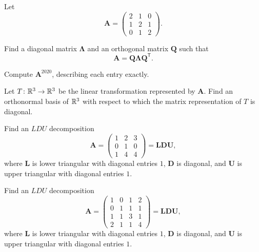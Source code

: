 \documentclass[11pt,oneside]{article}
\begin{document}
\begin{problem}
Let
\[
\mathbf A=
\begin{pmatrix}
2&1&0\\
1&2&1\\
0&1&2
\end{pmatrix}.
\]
\begin{problemsubparts}
\item Find a diagonal matrix $\boldsymbol\Lambda$ and an orthogonal matrix $\mathbf Q$ such that
\[
\mathbf A=\mathbf Q\boldsymbol\Lambda\mathbf Q^{\mathsf T}.
\]
\item Compute $\mathbf A^{2020}$, describing each entry exactly.
\item Let $T\colon \mathbb{R}^3\to\mathbb{R}^3$ be the linear transformation represented by $\mathbf A$. Find an orthonormal basis of $\mathbb{R}^3$ with respect to which the matrix representation of $T$ is diagonal.
\end{problemsubparts}
\end{problem}

\begin{problem}
Find an $LDU$ decomposition
\[
\mathbf A=
\begin{pmatrix}
1&2&3\\
0&1&0\\
1&4&4
\end{pmatrix}
=\mathbf L\mathbf D\mathbf U,
\]
where $\mathbf L$ is lower triangular with diagonal entries $1$, $\mathbf D$ is diagonal, and $\mathbf U$ is upper triangular with diagonal entries $1$.
\end{problem}

\begin{problem}
Find an $LDU$ decomposition
\[
\mathbf A=
\begin{pmatrix}
1&0&1&2\\
0&1&1&1\\
1&1&3&1\\
2&1&1&4
\end{pmatrix}
=\mathbf L\mathbf D\mathbf U,
\]
where $\mathbf L$ is lower triangular with diagonal entries $1$, $\mathbf D$ is diagonal, and $\mathbf U$ is upper triangular with diagonal entries $1$.
\end{problem}
\end{document}
